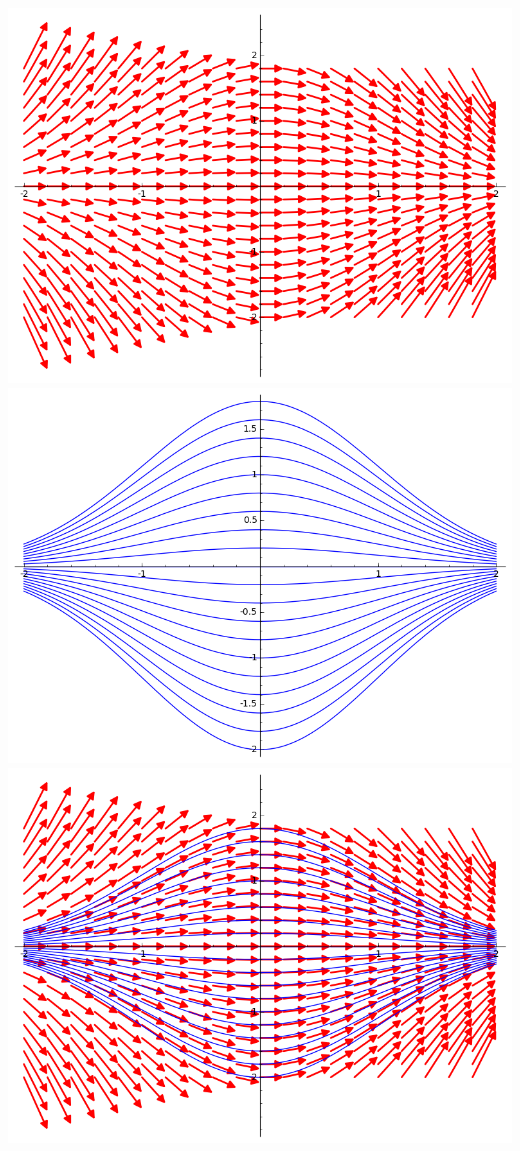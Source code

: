 \documentclass[class=report,crop=false]{standalone}
\begin{document}
\begin{center}
 \includegraphics[scale=0.35]{figures/equadiff-courbe1.png} \qquad
\includegraphics[scale=0.35]{figures/equadiff-courbe2.png} \\
\includegraphics[scale=0.35]{figures/equadiff-courbe3.png} \qquad

\end{center}
\end{document}
